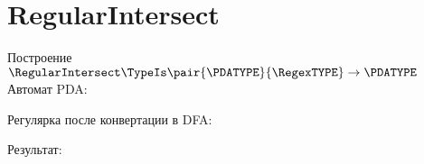\section{RegularIntersect}
\begin{frame}{Построение $\RegularIntersect\TypeIs\pair{\PDATYPE}{\RegexTYPE}\to\PDATYPE$}
	Автомат PDA:


	Регулярка после конвертации в DFA:


	Результат:


\end{frame}
